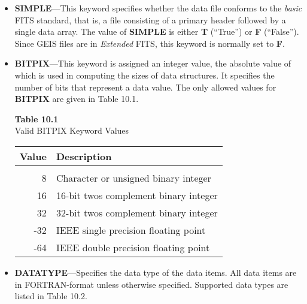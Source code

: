 \begin{itemize}

\item {\bf SIMPLE}---This keyword specifies whether the data file conforms to 
the {\it basic} FITS standard, that is, a file consisting of a primary header 
followed by a single data array.  The value of {\bf SIMPLE} is either 
{\bf T} (``True'') or {\bf F} (``False'').  Since GEIS files are in 
{\it Extended} FITS, this keyword is normally set to {\bf F}.
  
\item {\bf BITPIX}---This keyword is assigned an integer value, the absolute
value of which is used in computing the sizes of data structures.  It 
specifies the number of bits that represent a data value. The only 
allowed values for {\bf BITPIX} are given in Table 10.1.

\begin{scriptsize}
\begin{center}
{\bf Table 10.1}\\
Valid BITPIX Keyword Values\\
\end{center}
\begin{center}
\begin{tabular}{rl} \hline \hline
Value  & Description \\ \hline \\
8 & Character or unsigned binary integer\\
16 & 16-bit twos complement binary integer\\ 
32 & 32-bit twos complement binary integer\\ 
-32 & IEEE single precision floating point\\
-64 & IEEE double precision floating point\\ \hline
\end{tabular}
\end{center}
\end{scriptsize}
  
\item {\bf DATATYPE}---Specifies the data type of the data items.  All data
items are in FORTRAN-format unless otherwise specified.  Supported data types 
are listed in Table 10.2.


\end{itemize}
